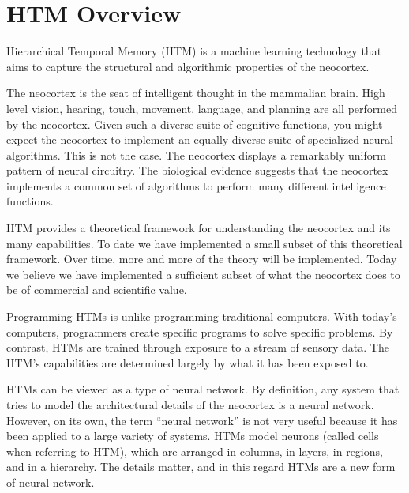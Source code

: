 \documentclass{report}
\begin{document}
\chapter{HTM Overview}
\label{chapter:overview}

Hierarchical Temporal Memory (HTM) is a machine learning technology
that aims to capture the structural and algorithmic properties of the
neocortex.

The neocortex is the seat of intelligent thought in the mammalian
brain. High level vision, hearing, touch, movement, language, and
planning are all performed by the neocortex. Given such a diverse
suite of cognitive functions, you might expect the neocortex to
implement an equally diverse suite of specialized neural
algorithms. This is not the case. The neocortex displays a remarkably
uniform pattern of neural circuitry. The biological evidence suggests
that the neocortex implements a common set of algorithms to perform
many different intelligence functions.

HTM provides a theoretical framework for understanding the neocortex
and its many capabilities. To date we have implemented a small subset
of this theoretical framework. Over time, more and more of the theory
will be implemented. Today we believe we have implemented a sufficient
subset of what the neocortex does to be of commercial and scientific
value.

Programming HTMs is unlike programming traditional computers. With
today's computers, programmers create specific programs to solve
specific problems. By contrast, HTMs are trained through exposure to a
stream of sensory data. The HTM's capabilities are determined largely
by what it has been exposed to.

HTMs can be viewed as a type of neural network. By definition, any
system that tries to model the architectural details of the neocortex
is a neural network. However, on its own, the term ``neural network'' is
not very useful because it has been applied to a large variety of
systems. HTMs model neurons (called cells when referring to HTM),
which are arranged in columns, in layers, in regions, and in a
hierarchy. The details matter, and in this regard HTMs are a new form
of neural network.
\end{document}
